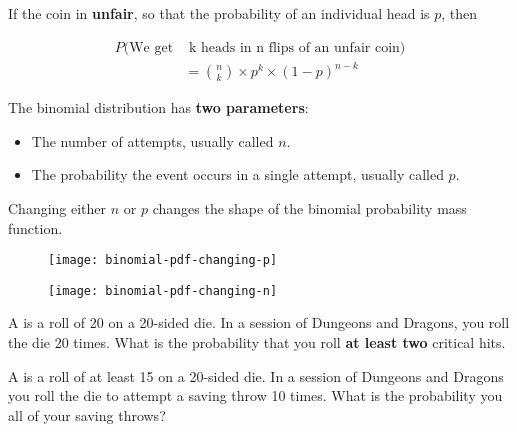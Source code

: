 %
\begin{frame}
If the coin in \textbf{unfair}, so that the probability of an individual head is
$p$, then

\begin{align*}
P(\text{We get} & \text{ k heads in n flips of an unfair coin}) \\
%
&= {{n}\choose{k}} \times p^k \times (1 - p)^{n - k}
\end{align*}

\end{frame}
%

%
\begin{frame}
The binomial distribution has \textbf{two parameters}:

\begin{itemize}
\item The number of attempts, usually called $n$.
\item The probability the event occurs in a single attempt, usually called $p$.
\end{itemize}

\end{frame}
%

%
\begin{frame}
Changing either $n$ or $p$ changes the shape of the binomial probability mass
function.

  \begin{figure}
    \texttt{[image: binomial-pdf-changing-p]}
  \end{figure}

\end{frame}
%

%
\begin{frame}

  \begin{figure}
    \texttt{[image: binomial-pdf-changing-n]}
  \end{figure}

\end{frame}
%

%
\begin{frame}

A  is a roll of 20 on a 20-sided die.  In a session of
Dungeons and Dragons, you roll the die 20 times.  What is the probability that
you roll \textbf{at least two} critical hits.

\hfill

A  is a roll of at least 15 on a 20-sided die.  In a session
of Dungeons and Dragons you roll the die to attempt a saving throw 10 times.
What is the probability you  all of your saving throws?

\end{frame}
%

